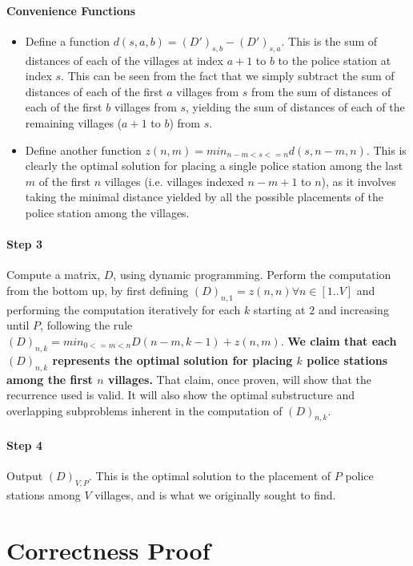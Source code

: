 \documentclass[twocolumn]{article}
\begin{document}
		\paragraph{Convenience Functions}
		\begin{itemize}
			\item Define a function $d(s, a, b) = (D')_{s, b} - (D')_{s, a}$. This is the sum of distances of each of the villages at index $a+1$ to $b$ to the police station at index $s$. This can be seen from the fact that we simply subtract the sum of distances of each of the first $a$ villages from $s$ from the sum of distances of each of the first $b$ villages from $s$, yielding the sum of distances of each of the remaining villages ($a+1$ to $b$) from $s$.
			\item Define another function $z(n, m) = min_{n-m < s <= n}{d(s, n-m, n)}$. This is clearly the optimal solution for placing a single police station among the last $m$ of the first $n$ villages (i.e. villages indexed $n-m+1$ to $n$), as it involves taking the minimal distance yielded by all the possible placements of the police station among the villages.
		\end{itemize}
		
		\paragraph{Step 3}
		Compute a matrix, $D$, using dynamic programming. Perform the computation from the bottom up, by first defining $(D)_{n, 1} = z(n, n) \forall n \in [1..V]$ and performing the computation iteratively for each $k$ starting at $2$ and increasing until $P$, following the rule $(D)_{n, k} = min_{0 <= m < n}{D(n-m, k-1) + z(n, m)}$. \textbf{We claim that each $(D)_{n, k}$ represents the optimal solution for placing $k$ police stations among the first $n$ villages.} That claim, once proven, will show that the recurrence used is valid. It will also show the optimal substructure and overlapping subproblems inherent in the computation of $(D)_{n, k}$.
		
		\paragraph{Step 4}
		Output $(D)_{V, P}$. This is the optimal solution to the placement of $P$ police stations among $V$ villages, and is what we originally sought to find.
			
	
	\section{Correctness Proof}
\end{document}
